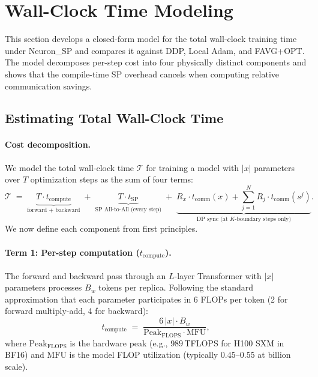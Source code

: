 \documentclass{article}
\begin{document}
\section{Wall-Clock Time Modeling}
\label{sec:wallclock_model}

This section develops a closed-form model for the total wall-clock
training time under Neuron\_SP and compares it against DDP, Local Adam,
and FAVG+OPT. The model decomposes per-step cost into four physically
distinct components and shows that the compile-time SP overhead cancels
when computing relative communication savings.

\subsection{Estimating Total Wall-Clock Time}
\label{sec:wallclock_bandwidth}

\paragraph{Cost decomposition.}
We model the total wall-clock time $\mathcal{T}$ for training a model
with $|x|$ parameters over $T$ optimization steps as the sum of four
terms:
\begin{equation}
\mathcal{T} \;=\;
\underbrace{T \cdot t_{\text{compute}}}_{\text{forward + backward}}
\;+\; \underbrace{T \cdot t_{\text{SP}}}_{\text{SP All-to-All (every step)}}
\;+\; \underbrace{R_x \cdot t_{\text{comm}}(x)
  + \sum_{j=1}^{N} R_j \cdot t_{\text{comm}}(s^j)
  }_{\text{DP sync (at $K$-boundary steps only)}}.
\label{eq:wallclock_total}
\end{equation}
We now define each component from first principles.

\paragraph{Term 1: Per-step computation ($t_{\text{compute}}$).}

The forward and backward pass through an $L$-layer Transformer with
$|x|$ parameters processes $B_w$ tokens per replica. Following the
standard approximation that each parameter participates in $6$ FLOPs
per token (2 for forward multiply-add, 4 for backward):
\begin{equation}
t_{\text{compute}} \;=\;
\frac{6\,|x| \cdot B_w}{\text{Peak}_{\text{FLOPS}} \cdot \text{MFU}},
\label{eq:t_compute}
\end{equation}
where $\text{Peak}_{\text{FLOPS}}$ is the hardware peak (e.g., $989$\,TFLOPS
for H100 SXM in BF16) and $\text{MFU}$ is the model FLOP utilization
(typically $0.45$--$0.55$ at billion scale).
\end{document}
